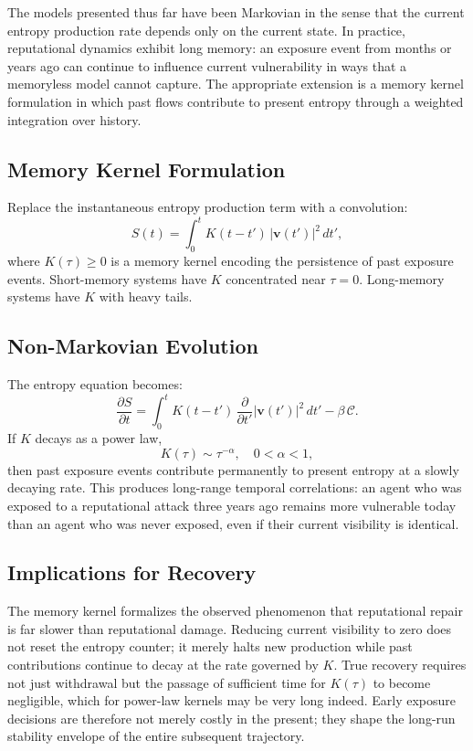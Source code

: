 \documentclass[12pt,a4paper]{article}
\begin{document}
The models presented thus far have been Markovian in the sense that the current entropy production rate depends only on the current state. In practice, reputational dynamics exhibit long memory: an exposure event from months or years ago can continue to influence current vulnerability in ways that a memoryless model cannot capture. The appropriate extension is a memory kernel formulation in which past flows contribute to present entropy through a weighted integration over history.

\subsection{Memory Kernel Formulation}

Replace the instantaneous entropy production term with a convolution:
\[
S(t) = \int_0^t K(t - t')\,|\mathbf{v}(t')|^2\,dt',
\]
where $K(\tau) \geq 0$ is a memory kernel encoding the persistence of past exposure events. Short-memory systems have $K$ concentrated near $\tau = 0$. Long-memory systems have $K$ with heavy tails.

\subsection{Non-Markovian Evolution}

The entropy equation becomes:
\[
\frac{\partial S}{\partial t}
=
\int_0^t K(t - t')\,\frac{\partial}{\partial t'}|\mathbf{v}(t')|^2\,dt'
- \beta\,\mathcal{C}.
\]
If $K$ decays as a power law,
\[
K(\tau) \sim \tau^{-\alpha}, \quad 0 < \alpha < 1,
\]
then past exposure events contribute permanently to present entropy at a slowly decaying rate. This produces long-range temporal correlations: an agent who was exposed to a reputational attack three years ago remains more vulnerable today than an agent who was never exposed, even if their current visibility is identical.

\subsection{Implications for Recovery}

The memory kernel formalizes the observed phenomenon that reputational repair is far slower than reputational damage. Reducing current visibility to zero does not reset the entropy counter; it merely halts new production while past contributions continue to decay at the rate governed by $K$. True recovery requires not just withdrawal but the passage of sufficient time for $K(\tau)$ to become negligible, which for power-law kernels may be very long indeed. Early exposure decisions are therefore not merely costly in the present; they shape the long-run stability envelope of the entire subsequent trajectory.
\end{document}

